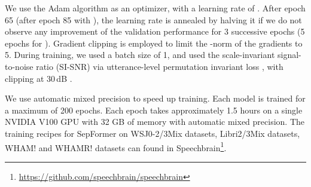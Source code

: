\documentclass[lettersize,journal]{IEEEtran}
\begin{document}
We use the Adam algorithm \cite{kingma2017adam} as an optimizer, with a learning rate of . After epoch 65 (after epoch 85 with \dataaug), the learning rate is annealed by halving it if we do not observe any improvement of the validation performance for 3 successive epochs (5 epochs for \dataaug). Gradient clipping is employed to limit the -norm of the gradients to 5. During training, we used a batch size of 1, and used the scale-invariant signal-to-noise ratio (SI-SNR) \cite{le2019sdr} via utterance-level permutation invariant loss \cite{kolbaek2017multitalker}, with clipping at 30\,dB \cite{zeghidour2020wavesplit}. 

We use automatic mixed precision to speed up training. Each model is trained for a maximum of 200 epochs. Each epoch takes approximately 1.5 hours on a single NVIDIA V100 GPU with 32 GB of memory with automatic mixed precision. The training recipes for SepFormer on WSJ0-2/3Mix datasets, Libri2/3Mix datasets, WHAM! and WHAMR! datasets can found in Speechbrain\footnote{\url{https://github.com/speechbrain/speechbrain}}. 
\end{document}
